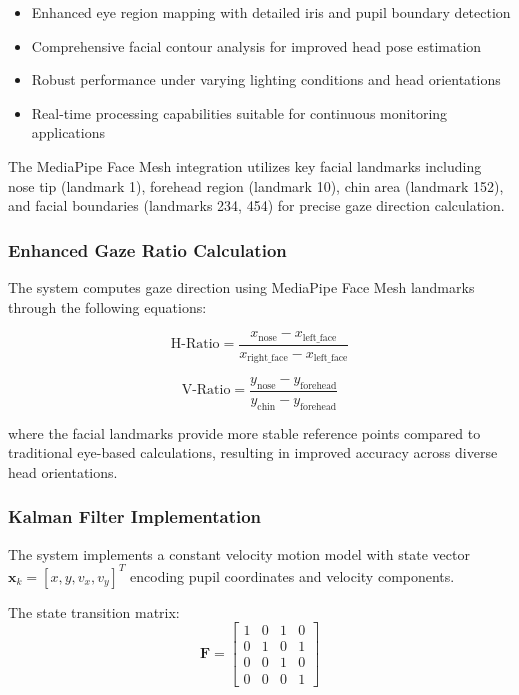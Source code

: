 \documentclass[conference]{IEEEtran}
\begin{document}
\begin{itemize}
    \item Enhanced eye region mapping with detailed iris and pupil boundary detection
    \item Comprehensive facial contour analysis for improved head pose estimation
    \item Robust performance under varying lighting conditions and head orientations
    \item Real-time processing capabilities suitable for continuous monitoring applications
\end{itemize}

The MediaPipe Face Mesh integration utilizes key facial landmarks including nose tip 
(landmark 1), forehead region (landmark 10), chin area (landmark 152), and facial 
boundaries (landmarks 234, 454) for precise gaze direction calculation.

\subsubsection{Enhanced Gaze Ratio Calculation}

The system computes gaze direction using MediaPipe Face Mesh landmarks through the 
following equations:

\begin{equation}
\text{H-Ratio} = \frac{x_{\text{nose}} - x_{\text{left\_face}}}{x_{\text{right\_face}} - x_{\text{left\_face}}}
\end{equation}

\begin{equation}
\text{V-Ratio} = \frac{y_{\text{nose}} - y_{\text{forehead}}}{y_{\text{chin}} - y_{\text{forehead}}}
\end{equation}

where the facial landmarks provide more stable reference points compared to traditional 
eye-based calculations, resulting in improved accuracy across diverse head orientations.

\subsubsection{Kalman Filter Implementation}

The system implements a constant velocity motion model with state vector 
$\mathbf{x}_k = [x, y, v_x, v_y]^T$ encoding pupil coordinates and velocity components. 

The state transition matrix:
\begin{equation}
\mathbf{F} = \begin{bmatrix}
1 & 0 & 1 & 0 \\
0 & 1 & 0 & 1 \\
0 & 0 & 1 & 0 \\
0 & 0 & 0 & 1
\end{bmatrix}
\end{equation}
\end{document}
